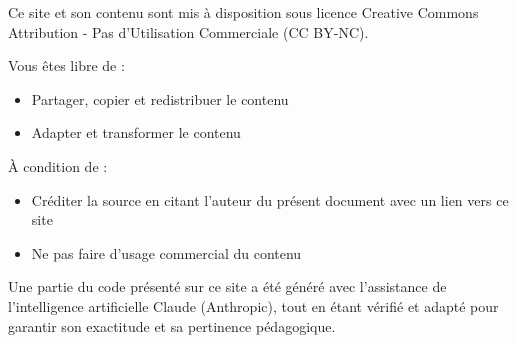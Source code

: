 \documentclass[
  12pt,
  letterpaper,
]{book}
\providecommand{\tightlist}{%
  \setlength{\itemsep}{0pt}\setlength{\parskip}{0pt}}\usepackage{longtable,booktabs,array}
\theoremstyle{remark}
\begin{document}

Ce site et son contenu sont mis à disposition sous licence Creative
Commons Attribution - Pas d'Utilisation Commerciale (CC BY-NC).

\begin{tcolorbox}[enhanced jigsaw, leftrule=.75mm, colback=white, opacitybacktitle=0.6, bottomrule=.15mm, colbacktitle=quarto-callout-note-color!10!white, opacityback=0, toptitle=1mm, arc=.35mm, coltitle=black, toprule=.15mm, colframe=quarto-callout-note-color-frame, titlerule=0mm, title=\textcolor{quarto-callout-note-color}{\faInfo}\hspace{0.5em}{Droits d'utilisation}, breakable, bottomtitle=1mm, rightrule=.15mm, left=2mm]

Vous êtes libre de :

\begin{itemize}
\tightlist
\item
  Partager, copier et redistribuer le contenu
\item
  Adapter et transformer le contenu
\end{itemize}

À condition de :

\begin{itemize}
\tightlist
\item
  Créditer la source en citant l'auteur du présent document avec un lien
  vers ce site
\item
  Ne pas faire d'usage commercial du contenu
\end{itemize}

Une partie du code présenté sur ce site a été généré avec l'assistance
de l'intelligence artificielle Claude (Anthropic), tout en étant vérifié
et adapté pour garantir son exactitude et sa pertinence pédagogique.

\end{tcolorbox}
\end{document}
